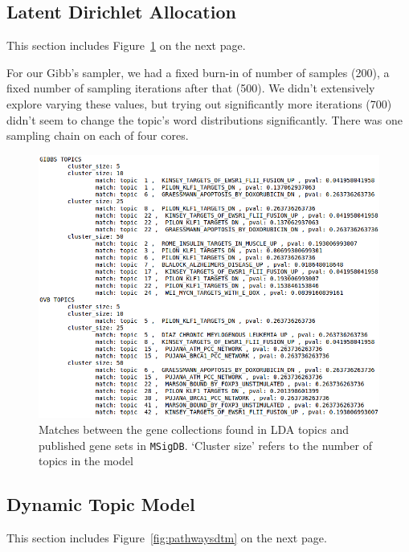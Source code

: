 \documentclass{article}
\begin{document}
\subsection{Latent Dirichlet Allocation}
\label{ldaappendix}

This section includes Figure~\ref{fig:pathways} on the next page.

For our Gibb's sampler, we had a fixed burn-in of number of samples (200), a fixed number of sampling iterations after that (500). We didn't extensively explore varying these values, but trying out significantly more iterations (700) didn't seem to change the topic's word distributions significantly. There was one sampling chain on each of four cores.

\begin{figure}
    \centering
    \includegraphics[width=1\textwidth]{figs/pathways}
    \caption{Matches between the gene collections found in LDA topics and published gene sets in \texttt{MSigDB}. `Cluster size' refers to the number of topics in the model}
    \label{fig:pathways}
\end{figure}

\subsection{Dynamic Topic Model}
\label{dtmappendix}

This section includes Figure~\ref{fig:pathwaysdtm} on the next page.
\end{document}
